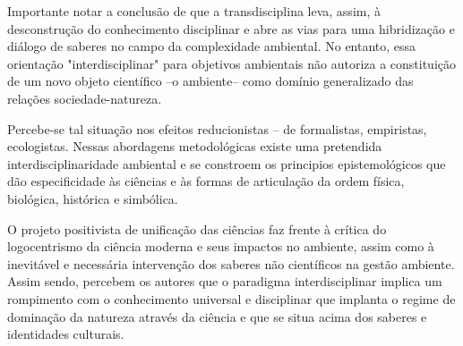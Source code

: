 \documentclass[
   article,       %
   12pt,          %
   oneside,       %
   a4paper,       %
   english,       %
   brazil,           %
   sumario=tradicional
   ]{abntex2}
\begin{document}
Importante notar a conclusão de que a transdisciplina leva, assim, à desconstrução do conhecimento disciplinar e abre as vias para uma hibridização e diálogo de saberes no campo da complexidade ambiental. No entanto, essa orientação "interdisciplinar" para objetivos ambientais não autoriza a constituição de um novo objeto científico –o ambiente– como domínio generalizado das relações sociedade-natureza.

Percebe-se tal situação nos efeitos reducionistas – de formalistas, empiristas, ecologistas. Nessas abordagens metodológicas existe uma pretendida interdisciplinaridade ambiental e se constroem os principios epistemológicos que dão especificidade às ciências e às formas de articulação da ordem  física, biológica, histórica e simbólica. 

O projeto positivista de unificação das ciências faz frente à crítica do logocentrismo da ciência moderna e seus impactos no ambiente, assim como à inevitável e necessária intervenção dos saberes não científicos na gestão ambiente. Assim sendo, percebem os autores que o paradigma interdisciplinar implica um rompimento com o conhecimento universal e disciplinar que implanta o regime de dominação da natureza através da ciência e que se situa acima dos saberes e identidades culturais.



\postextual


\end{document}
